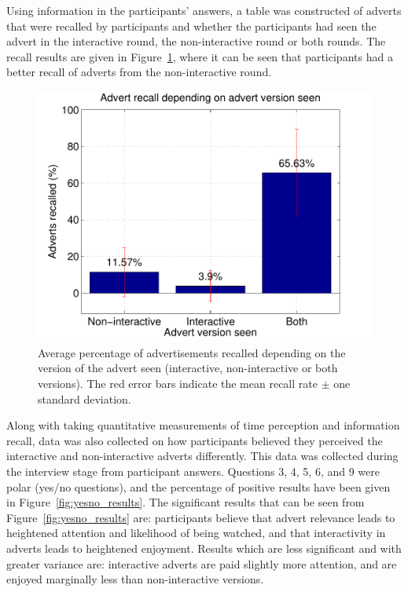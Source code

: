 	Using information in the participants' answers, a table was constructed of adverts that were recalled by participants and whether the participants had seen the advert in the interactive round, the non-interactive round or both rounds. The recall results are given in Figure~\ref{fig:recall}, where it can be seen that participants had a better recall of adverts from the non-interactive round. 

	\begin{figure}[!ht]
		\centering
		\includegraphics[width=\textwidth]{images/recall.pdf}
		\caption{Average percentage of advertisements recalled depending on the version of the advert seen (interactive, non-interactive or both versions). The red error bars indicate the mean recall rate $\pm$ one standard deviation.}
		\label{fig:recall}
	\end{figure}

	Along with taking quantitative measurements of time perception and information recall, data was also collected on how participants believed they perceived the interactive and non-interactive adverts differently. This data was collected during the interview stage from participant answers. Questions 3, 4, 5, 6, and 9 were polar (yes/no questions), and the percentage of positive results have been given in Figure~\ref{fig:yesno_results}. The significant results that can be seen from Figure~\ref{fig:yesno_results} are: participants believe that advert relevance leads to heightened attention and likelihood of being watched, and that interactivity in adverts leads to heightened enjoyment. Results which are less significant and with greater variance are: interactive adverts are paid slightly more attention, and are enjoyed marginally less than non-interactive versions.

